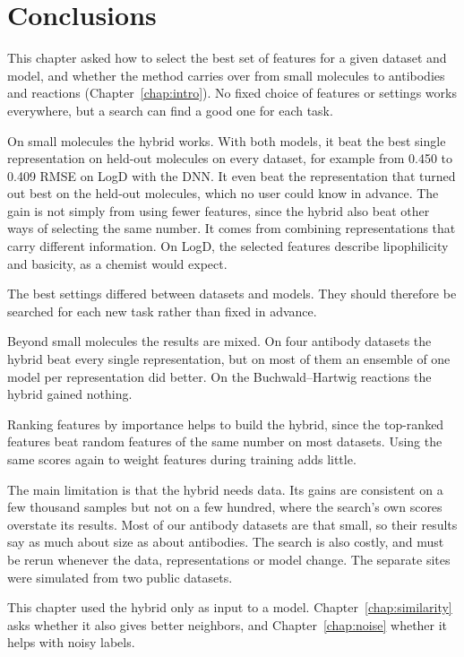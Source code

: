 \section{Conclusions}

This chapter asked how to select the best set of features for a given dataset and model, and whether the method carries over from small molecules to antibodies and reactions (Chapter~\ref{chap:intro}). No fixed choice of features or settings works everywhere, but a search can find a good one for each task.

On small molecules the hybrid works. With both models, it beat the best single representation on held-out molecules on every dataset, for example from 0.450 to 0.409 RMSE on LogD with the DNN. It even beat the representation that turned out best on the held-out molecules, which no user could know in advance. The gain is not simply from using fewer features, since the hybrid also beat other ways of selecting the same number. It comes from combining representations that carry different information. On LogD, the selected features describe lipophilicity and basicity, as a chemist would expect.

The best settings differed between datasets and models. They should therefore be searched for each new task rather than fixed in advance.

Beyond small molecules the results are mixed. On four antibody datasets the hybrid beat every single representation, but on most of them an ensemble of one model per representation did better. On the Buchwald--Hartwig reactions the hybrid gained nothing.

Ranking features by importance helps to build the hybrid, since the top-ranked features beat random features of the same number on most datasets. Using the same scores again to weight features during training adds little.

\label{sec:method:limitations}
The main limitation is that the hybrid needs data. Its gains are consistent on a few thousand samples but not on a few hundred, where the search's own scores overstate its results. Most of our antibody datasets are that small, so their results say as much about size as about antibodies. The search is also costly, and must be rerun whenever the data, representations or model change. The separate sites were simulated from two public datasets.

This chapter used the hybrid only as input to a model. Chapter~\ref{chap:similarity} asks whether it also gives better neighbors, and Chapter~\ref{chap:noise} whether it helps with noisy labels.
